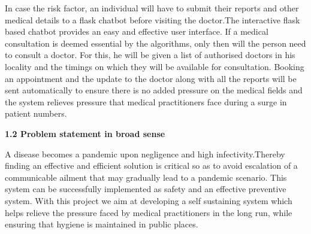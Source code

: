 \documentclass[12pt]{article}
\begin{document}
\vspace{\baselineskip}
\setlength{\parskip}{9.96pt}
\setlength{\parskip}{0.0pt}
\begin{justify}
 \tab In case the risk factor, an individual will have to submit their reports and other medical details to a flask chatbot before visiting the doctor.The interactive flask based chatbot provides an easy and effective user interface. If a medical consultation is deemed essential by the algorithms, only then will the person need to consult a doctor. For this, he will be given a list of authorised doctors in his locality and the timings on which they will be available for consultation. Booking an appointment and the update to the doctor along with all the reports will be sent automatically to ensure there is no added pressure on the medical fields and the system relieves pressure that medical practitioners face during a surge in patient numbers.
\end{justify}

\vspace{\baselineskip}
\setlength{\parskip}{9.96pt}
\setlength{\parskip}{0.0pt}
\vspace{\baselineskip}
\vspace{\baselineskip}
\vspace{\baselineskip}
\vspace{\baselineskip}
\vspace{\baselineskip}
\vspace{\baselineskip}

{\fontsize{14pt}{16.8pt}\selectfont \textbf{1.2 Problem statement in broad sense }}
\vspace{\baselineskip}
\vspace{\baselineskip}
\begin{justify}
A disease becomes a pandemic upon negligence and high infectivity.Thereby finding an effective and efficient solution is critical so as to avoid escalation of a communicable ailment that may gradually lead to a pandemic scenario. This system can be successfully implemented as safety and an effective preventive system.{\fontsize{14pt}{16.8pt}\selectfont \textbf{ }}With this project we aim at developing a self sustaining system which helps relieve the pressure faced by medical practitioners in the long run, while ensuring that hygiene is maintained in public places.
\end{justify}
\end{document}
